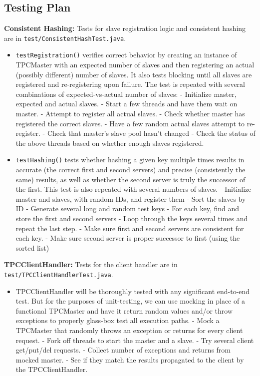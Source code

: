 \subsection{Testing Plan}
\textbf{Consistent Hashing:} Tests for slave registration logic and consistent hashing are in \texttt{test/ConsistentHashTest.java}.
\begin{itemize}
\item \texttt{testRegistration()} verifies correct behavior by creating an instance of TPCMaster with an expected number of slaves and then registering an actual (possibly different) number of slaves. It also tests blocking until all slaves are registered and re-registering upon failure. The test is repeated with several combinations of expected-vs-actual number of slaves:
\subitem - Initialize master, expected and actual slaves.
\subitem - Start a few threads and have them wait on master.
\subitem - Attempt to register all actual slaves.
\subitem - Check whether master has registered the correct slaves.
\subitem - Have a few random actual slaves attempt to re-register.
\subitem - Check that master's slave pool hasn't changed
\subitem - Check the status of the above threads based on whether enough slaves registered.
\item \texttt{testHashing()} tests whether hashing a given key multiple times results in accurate (the correct first and second servers) and precise (consistently the same) results, as well as whether the second server is truly the successor of the first. This test is also repeated with several numbers of slaves.
\subitem - Initialize master and slaves, with random IDs, and register them
\subitem - Sort the slaves by ID
\subitem - Generate several long and random test keys
\subitem - For each key, find and store the first and second servers
\subitem - Loop through the keys several times and repeat the last step.
\subitem - Make sure first and second servers are consistent for each key.
\subitem - Make sure second server is proper successor to first (using the sorted list)
\end{itemize}
\textbf{TPCClientHandler:} Tests for the client handler are in \texttt{test/TPCClientHandlerTest.java}.
\begin{itemize}
\item TPCClientHandler will be thoroughly tested with any significant end-to-end test. But for the purposes of unit-testing, we can use mocking in place of a functional TPCMaster and have it return random values and/or throw exceptions to properly glass-box test all execution paths.
\subitem - Mock a TPCMaster that randomly throws an exception or returns for every client request.
\subitem - Fork off threads to start the master and a slave.
\subitem - Try several client get/put/del requests.
\subitem - Collect number of exceptions and returns from mocked master.
\subitem - See if they match the results propagated to the client by the TPCClientHandler.
\end{itemize}
